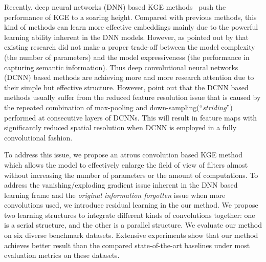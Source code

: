 \documentclass[11pt]{article}
\begin{document}
Recently, deep  neural networks (DNN) based KGE methods~\cite{Dettmers:2018,Nguyen:2018,Yao:2020,Vashishth:2020a,Vashishth:2020b} push the performance of KGE to a soaring height. Compared with previous methods, this kind of methods can learn more effective embeddings mainly due to the powerful learning ability inherent in the DNN models. However, as pointed out by  that existing research did not make a proper trade-off between the model complexity (the number of parameters) and the model expressiveness (the performance in capturing semantic information). Thus deep convolutional neural networks (DCNN) based methods  are achieving more and more research attention due to their simple but effective structure. 
However,  point out that the DCNN based methods usually suffer from the reduced feature resolution issue that is caused by the repeated combination of max-pooling and down-sampling(“\emph{striding}”) performed at consecutive layers of {DCNNs}. This will result in feature maps with significantly reduced spatial resolution when {DCNN} is employed in a fully convolutional fashion.

To address this issue, we propose an atrous convolution  based KGE method which allows the model to effectively enlarge the field of view of filters almost without increasing the number of parameters or the amount of computations. To address the vanishing/exploding gradient issue inherent in the DNN based learning frame and the \emph{original information forgotten} issue when more convolutions used, we introduce residual learning in the our method.  We propose two learning structures  to integrate different kinds of convolutions  together: one is a  serial structure, and the other is a parallel  structure. 
We evaluate our method on six diverse benchmark datasets. Extensive experiments show that our method achieves better result than the compared state-of-the-art baselines under most evaluation metrics on these datasets. 
\end{document}
